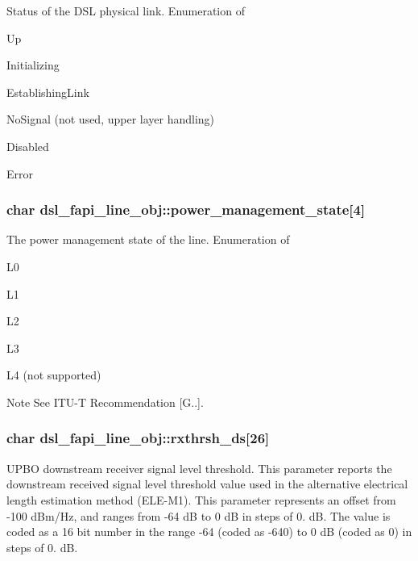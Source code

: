 Status of the D\-S\-L physical link. Enumeration of
\begin{DoxyItemize}
\item Up
\item Initializing
\item Establishing\-Link
\item No\-Signal (not used, upper layer handling)
\item Disabled
\item Error 
\end{DoxyItemize}\hypertarget{structdsl__fapi__line__obj_a68ff1d736ad8367e195bd2d616a5db96}{
\subsubsection[{power\-\_\-management\-\_\-state}]{\setlength{\rightskip}{0pt plus 5cm}char dsl\-\_\-fapi\-\_\-line\-\_\-obj\-::power\-\_\-management\-\_\-state\mbox{[}4\mbox{]}}}\label{structdsl__fapi__line__obj_a68ff1d736ad8367e195bd2d616a5db96}
The power management state of the line. Enumeration of
\begin{DoxyItemize}
\item L0
\item L1
\item L2
\item L3
\item L4 (not supported) \begin{DoxyNote}{Note}
See I\-T\-U-\/\-T Recommendation \mbox{[}G..\mbox{]}. 
\end{DoxyNote}

\end{DoxyItemize}\hypertarget{structdsl__fapi__line__obj_a690fe932966a61e91cf60cc3142ffbbc}{
\subsubsection[{rxthrsh\-\_\-ds}]{\setlength{\rightskip}{0pt plus 5cm}char dsl\-\_\-fapi\-\_\-line\-\_\-obj\-::rxthrsh\-\_\-ds\mbox{[}26\mbox{]}}}\label{structdsl__fapi__line__obj_a690fe932966a61e91cf60cc3142ffbbc}
U\-P\-B\-O downstream receiver signal level threshold. This parameter reports the downstream received signal level threshold value used in the alternative electrical length estimation method (E\-L\-E-\/\-M1). This parameter represents an offset from -\/100 d\-Bm/\-Hz, and ranges from -\/64 d\-B to 0 d\-B in steps of 0. d\-B. The value is coded as a 16 bit number in the range -\/64 (coded as -\/640) to 0 d\-B (coded as 0) in steps of 0. d\-B.

